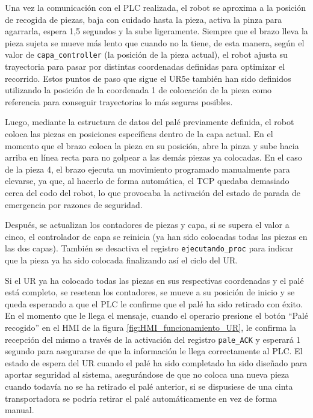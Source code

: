 Una vez la comunicación con el PLC realizada, el robot se aproxima a la posición de recogida de piezas, baja con cuidado hasta la pieza, activa la pinza para agarrarla, espera 1,5 segundos y la sube ligeramente. Siempre que el brazo lleva la pieza sujeta se mueve más lento que cuando no la tiene, de esta manera, según el valor de \texttt{capa\_controller} (la posición de la pieza actual), el robot ajusta su trayectoria para pasar por distintas coordenadas definidas para optimizar el recorrido. Estos puntos de paso que sigue el UR5e también han sido definidos utilizando la posición de la coordenada 1 de colocación de la pieza como referencia para conseguir trayectorias lo más seguras posibles.

Luego, mediante la estructura de datos del palé previamente definida, el robot coloca las piezas en posiciones específicas dentro de la capa actual. En el momento que el brazo coloca la pieza en su posición, abre la pinza y sube hacia arriba en línea recta para no golpear a las demás piezas ya colocadas. En el caso de la pieza 4, el brazo ejecuta un movimiento programado manualmente para elevarse, ya que, al hacerlo de forma automática, el TCP quedaba demasiado cerca del codo del robot, lo que provocaba la activación del estado de parada de emergencia por razones de seguridad.

Después, se actualizan los contadores de piezas y capa, si se supera el valor a cinco, el controlador de capa se reinicia (ya han sido colocadas todas las piezas en las dos capas). También se desactiva el registro \texttt{ejecutando\_proc} para indicar que la pieza ya ha sido colocada finalizando así el ciclo del UR.

Si el UR ya ha colocado todas las piezas en sus respectivas coordenadas y el palé está completo, se resetean los contadores, se mueve a su posición de inicio y se queda esperando a que el PLC le confirme que el palé ha sido retirado con éxito. En el momento que le llega el mensaje, cuando el operario presione el botón ``Palé recogido'' en el HMI de la figura \ref{fig:HMI_funcionamiento_UR}, le confirma la recepción del mismo a través de la activación del registro \texttt{pale\_ACK} y esperará 1 segundo para asegurarse de que la información le llega correctamente al PLC. El estado de espera del UR cuando el palé ha sido completado ha sido diseñado para aportar seguridad al sistema, asegurándose de que no coloca una nueva pieza cuando todavía no se ha retirado el palé anterior, si se dispusiese de una cinta transportadora se podría retirar el palé automáticamente en vez de forma manual. 

